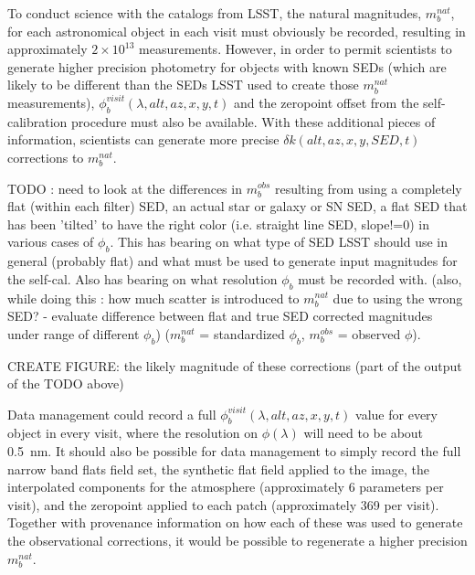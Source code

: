 \documentclass[12pt,preprint]{aastex}
\begin{document}
To conduct science with the catalogs from LSST, the natural magnitudes, $m_b^{nat}$, for each astronomical object in
each visit must obviously be recorded, resulting in approximately
$2\times10^{13}$ measurements. However, in order to permit scientists
to generate higher precision photometry for objects with known SEDs
(which are likely to be different than the SEDs LSST used to create
those $m_b^{nat}$ measurements),
$\phi_b^{visit}(\lambda,alt,az,x,y,t)$ and the zeropoint offset from
the self-calibration procedure must also be available. With these
additional pieces of information, scientists can generate more precise
$\delta k(alt,az,x,y,SED,t)$ corrections to $m_b^{nat}$.

TODO : need to look at the differences in $m_b^{obs}$ resulting from
using a completely flat (within each filter) SED, an actual star or
galaxy or SN SED, a flat SED that has been 'tilted' to have the right
color (i.e. straight line SED, slope!=0) in various cases of
$\phi_b$. This has bearing on what type of SED LSST should use in
general (probably flat) and what must be used to generate input
magnitudes for the self-cal. Also has bearing on what resolution
$\phi_b$ must be recorded with.   (also, while doing this : how much
scatter is introduced to $m_b^{nat}$ due to using the wrong SED? -
evaluate difference between flat and true SED corrected magnitudes under range of different
$\phi_b$)  ($m_b^{nat}$ = standardized $\phi_b$, $m_b^{obs}$ =
observed $\phi$). 

CREATE FIGURE: the likely magnitude of these corrections (part of the output
of the TODO above)

Data management could record a full $\phi_b^{visit}(\lambda,alt,az,x,y,t)$ value
for every object in every visit, where the resolution on
$\phi(\lambda)$ will need to be about 0.5~nm.  It should also be possible
for data management to simply record the full narrow band flats field
set, the synthetic flat field applied to the image, 
the interpolated components for the atmosphere (approximately 6
parameters per visit), and the zeropoint applied to each patch
(approximately 369 per visit). Together with provenance information on
how each of these was used to generate the observational corrections,
it would be possible to regenerate a higher precision $m_b^{nat}$. 






\end{document}
